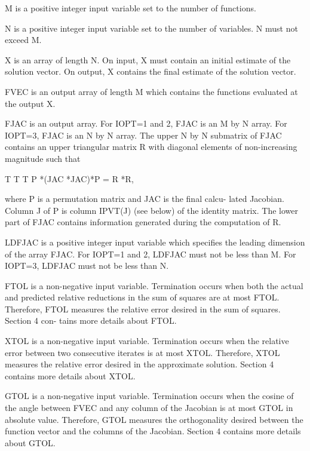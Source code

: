 \documentclass[11pt,twoside,nolof]{starlink}
\begin{document}
\begin{terminalv}
       M is a positive integer input variable set to the number of
         functions.

       N is a positive integer input variable set to the number of
         variables.  N must not exceed M.

       X is an array of length N.  On input, X must contain an initial
         estimate of the solution vector.  On output, X contains the
         final estimate of the solution vector.

       FVEC is an output array of length M which contains the functions
         evaluated at the output X.

       FJAC is an output array.  For IOPT=1 and 2, FJAC is an M by N
         array.  For IOPT=3, FJAC is an N by N array.  The upper N by N
         submatrix of FJAC contains an upper triangular matrix R with
         diagonal elements of non-increasing magnitude such that

                T     T           T
               P *(JAC *JAC)*P = R *R,

         where P is a permutation matrix and JAC is the final calcu-
         lated Jacobian.  Column J of P is column IPVT(J) (see below)
         of the identity matrix.  The lower part of FJAC contains
         information generated during the computation of R.

       LDFJAC is a positive integer input variable which specifies
         the leading dimension of the array FJAC.  For IOPT=1 and 2,
         LDFJAC must not be less than M.  For IOPT=3, LDFJAC must not
         be less than N.

       FTOL is a non-negative input variable.  Termination occurs when
         both the actual and predicted relative reductions in the sum
         of squares are at most FTOL.  Therefore, FTOL measures the
         relative error desired in the sum of squares.  Section 4 con-
         tains more details about FTOL.

       XTOL is a non-negative input variable.  Termination occurs when
         the relative error between two consecutive iterates is at most
         XTOL.  Therefore, XTOL measures the relative error desired in
         the approximate solution.  Section 4 contains more details
         about XTOL.

       GTOL is a non-negative input variable.  Termination occurs when
         the cosine of the angle between FVEC and any column of the
         Jacobian is at most GTOL in absolute value.  Therefore, GTOL
         measures the orthogonality desired between the function vector
         and the columns of the Jacobian.  Section 4 contains more
         details about GTOL.


\end{terminalv}
\end{document}
